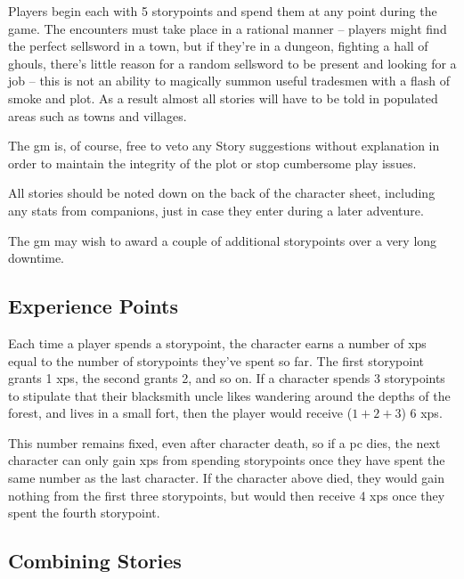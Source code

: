 \begin{multicols}{2}

\noindent
Players begin each with 5 \glspl{storypoint} and spend them at any point during the game.
The encounters must take place in a rational manner -- players might find the perfect sellsword in a town, but if they're in a dungeon, fighting a hall of ghouls, there's little reason for a random sellsword to be present and looking for a job -- this is not an ability to magically summon useful tradesmen with a flash of smoke and plot.
As a result almost all stories will have to be told in populated areas such as towns and villages.

The \gls{gm} is, of course, free to veto any Story suggestions without explanation in order to maintain the integrity of the plot or stop cumbersome play issues.

All stories should be noted down on the back of the character sheet, including any stats from companions, just in case they enter during a later \gls{adventure}.

The \gls{gm} may wish to award a couple of additional \glspl{storypoint} over a very long \gls{downtime}.

\subsection{Experience Points}
\label{storyXP}

Each time a player spends a \gls{storypoint}, the character earns a number of \glspl{xp} equal to the number of \glspl{storypoint} they've spent so far.
The first \gls{storypoint} grants 1 \glspl{xp}, the second grants 2, and so on.
If a character spends 3 \glspl{storypoint} to stipulate that their blacksmith uncle likes wandering around the depths of the forest, and lives in a small fort, then the player would receive ($1+2+3$) 6 \glspl{xp}.

This number remains fixed, even after character death, so if a \gls{pc} dies, the next character can only gain \glspl{xp} from spending \glspl{storypoint} once they have spent the same number as the last character.
If the character above died, they would gain nothing from the first three \glspl{storypoint}, but would then receive 4 \glspl{xp} once they spent the fourth \gls{storypoint}.

\subsection{Combining Stories}


\end{multicols}

